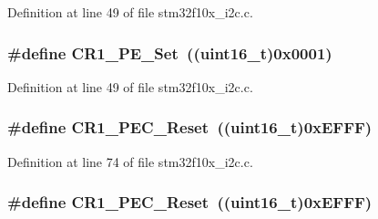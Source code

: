 Definition at line 49 of file stm32f10x\+\_\+i2c.\+c.

\subsubsection[{\texorpdfstring{C\+R1\+\_\+\+P\+E\+\_\+\+Set}{CR1_PE_Set}}]{\setlength{\rightskip}{0pt plus 5cm}\#define C\+R1\+\_\+\+P\+E\+\_\+\+Set~(({\bf uint16\+\_\+t})0x0001)}\hypertarget{group___i2_c___private___defines_ga913b708338087f3ffc2fba2b05a38917}{}\label{group___i2_c___private___defines_ga913b708338087f3ffc2fba2b05a38917}


Definition at line 49 of file stm32f10x\+\_\+i2c.\+c.

\subsubsection[{\texorpdfstring{C\+R1\+\_\+\+P\+E\+C\+\_\+\+Reset}{CR1_PEC_Reset}}]{\setlength{\rightskip}{0pt plus 5cm}\#define C\+R1\+\_\+\+P\+E\+C\+\_\+\+Reset~(({\bf uint16\+\_\+t})0x\+E\+F\+F\+F)}\hypertarget{group___i2_c___private___defines_gabb6969dfa44c3539ef93f04f8136c3c7}{}\label{group___i2_c___private___defines_gabb6969dfa44c3539ef93f04f8136c3c7}


Definition at line 74 of file stm32f10x\+\_\+i2c.\+c.

\subsubsection[{\texorpdfstring{C\+R1\+\_\+\+P\+E\+C\+\_\+\+Reset}{CR1_PEC_Reset}}]{\setlength{\rightskip}{0pt plus 5cm}\#define C\+R1\+\_\+\+P\+E\+C\+\_\+\+Reset~(({\bf uint16\+\_\+t})0x\+E\+F\+F\+F)}\hypertarget{group___i2_c___private___defines_gabb6969dfa44c3539ef93f04f8136c3c7}{}\label{group___i2_c___private___defines_gabb6969dfa44c3539ef93f04f8136c3c7}


